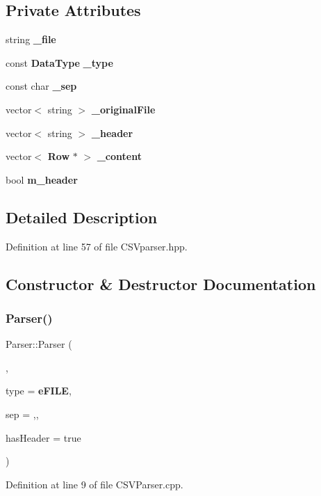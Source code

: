 \subsection*{Private Attributes}
\begin{DoxyCompactItemize}
\item 
string \textbf{ \+\_\+file}
\item 
const \textbf{ Data\+Type} \textbf{ \+\_\+type}
\item 
const char \textbf{ \+\_\+sep}
\item 
vector$<$ string $>$ \textbf{ \+\_\+original\+File}
\item 
vector$<$ string $>$ \textbf{ \+\_\+header}
\item 
vector$<$ \textbf{ Row} $\ast$ $>$ \textbf{ \+\_\+content}
\item 
bool \textbf{ m\+\_\+header}
\end{DoxyCompactItemize}


\subsection{Detailed Description}


Definition at line 57 of file C\+S\+Vparser.\+hpp.



\subsection{Constructor \& Destructor Documentation}
\mbox{\label{class_parser_acdb936b8a1723b1f342dfffbd6df310a}} 
\subsubsection{Parser()}
{\footnotesize\ttfamily Parser\+::\+Parser (\begin{DoxyParamCaption}\item[{const string \&}]{,  }\item[{const \textbf{ Data\+Type} \&}]{type = {\ttfamily \textbf{ e\+F\+I\+LE}},  }\item[{char}]{sep = {\ttfamily \textquotesingle{},\textquotesingle{}},  }\item[{bool}]{has\+Header = {\ttfamily true} }\end{DoxyParamCaption})}



Definition at line 9 of file C\+S\+V\+Parser.\+cpp.

